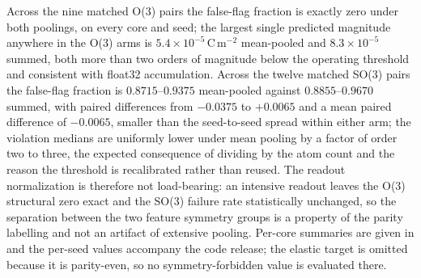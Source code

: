 Across the nine matched O(3) pairs the false-flag fraction is exactly zero under both poolings, on every core and seed; the largest single predicted magnitude anywhere in the O(3) arms is $5.4\times10^{-5}$\,C\,m$^{-2}$ mean-pooled and $8.3\times10^{-5}$ summed, both more than two orders of magnitude below the operating threshold and consistent with float32 accumulation. Across the twelve matched SO(3) pairs the false-flag fraction is $0.8715$--$0.9375$ mean-pooled against $0.8855$--$0.9670$ summed, with paired differences from $-0.0375$ to $+0.0065$ and a mean paired difference of $-0.0065$, smaller than the seed-to-seed spread within either arm; the violation medians are uniformly lower under mean pooling by a factor of order two to three, the expected consequence of dividing by the atom count and the reason the threshold is recalibrated rather than reused. The readout normalization is therefore not load-bearing: an intensive readout leaves the O(3) structural zero exact and the SO(3) failure rate statistically unchanged, so the separation between the two feature symmetry groups is a property of the parity labelling and not an artifact of extensive pooling. Per-core summaries are given in  and the per-seed values accompany the code release; the elastic target is omitted because it is parity-even, so no symmetry-forbidden value is evaluated there.

